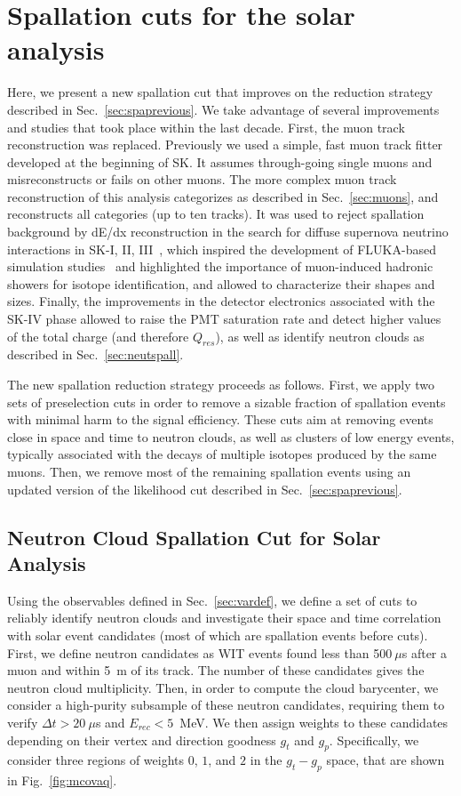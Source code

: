 \section{Spallation cuts for the solar analysis}
\label{sec:spacuts}
Here, we present a new spallation cut that improves on the reduction strategy described in Sec.~\ref{sec:spaprevious}. We take advantage of several improvements and studies that took place within the last decade. First, the muon track reconstruction was replaced. Previously we used a simple, fast muon track fitter developed at the beginning of SK. It assumes through-going single muons and misreconstructs or fails on other muons. The more complex muon track reconstruction of this analysis categorizes as described in Sec.~\ref{sec:muons}, and reconstructs all categories (up to ten tracks). It was used to reject spallation background by dE/dx reconstruction in the search for diffuse supernova neutrino interactions in SK-I, II, III~\cite{bib:sksrn123}, which
inspired the development of
FLUKA-based simulation studies~\cite{BLi_1} and highlighted the importance of muon-induced hadronic showers for isotope identification, and allowed to characterize their shapes and sizes. Finally, the improvements in the detector electronics associated with the SK-IV phase allowed to raise the PMT saturation rate and detect higher values of the total charge (and therefore $Q_{res}$), as well as identify neutron clouds as described in Sec.~\ref{sec:neutspall}.

The new spallation reduction strategy proceeds as follows. First, we apply two sets of preselection cuts in order to remove a sizable fraction of spallation events with minimal harm to the signal efficiency. These cuts aim at removing events close in space and time to neutron clouds, as well as clusters of low energy events, typically associated with the decays of multiple isotopes produced by the same muons. Then, we remove most of the remaining spallation events using an updated version of the likelihood cut described in Sec.~\ref{sec:spaprevious}. 

\subsection{Neutron Cloud Spallation Cut for Solar Analysis}
\label{sec:cloudcut}
Using the observables defined in Sec.~\ref{sec:vardef}, we define a set of cuts to reliably identify neutron clouds and investigate their space and time correlation with solar event candidates (most of which are spallation events before cuts). First, we define neutron candidates as WIT events found less than 500$~\mu$s after a muon and within 5~m of its track. The number of these candidates gives the neutron cloud multiplicity. Then, in order to compute the cloud barycenter, we consider a high-purity subsample of these neutron candidates, requiring them to verify $\Delta t >  20~\mu$s and $E_{rec} < 5$~MeV. We then assign weights to these candidates depending on their vertex and direction goodness $g_t$ and $g_p$. Specifically, we consider three regions of weights $0$, $1$, and $2$ in the $g_t-g_p$ space, that are shown in Fig.~\ref{fig:mcovaq}.

